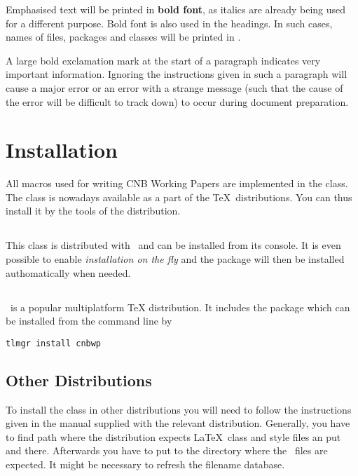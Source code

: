 \documentclass[12pt]{article}
\begin{document}
Emphasised text will be printed in \textbf{bold font}, as italics are already being used for a
different purpose. Bold font is also used in the headings. In such cases, names of files, packages
and classes will be printed in \textbf{}.

\pozor A large bold exclamation mark at the start of a paragraph indicates very important
information. Ignoring the instructions given in such a paragraph will cause a major error or an
error with a strange message (such that the cause of the error will be difficult to track down) to
occur during document preparation.

\section{Installation}\label{instalace} All macros used for writing CNB Working
Papers are implemented in the  class. The class is nowadays available as a part of
the \TeX\ distributions. You can thus install it by the tools of the distribution.

\subsection{\MikTeX}\label{inst.miktex}
This class is distributed with \MikTeX\ and can be installed from its console. It is even possible to
enable \textit{installation on the fly} and the package will then be installed authomatically when
needed.

\subsection{\TeXLive}\label{inst.tl}
\TeXLive\ is a popular multiplatform \TeX{} distribution. It includes the package which can be
installed from the command line by

\begin{verbatim}
tlmgr install cnbwp
\end{verbatim}
	
\subsection{Other Distributions}\label{inst.other}
To install the  class in other
distributions you will need to follow the instructions given in the manual supplied with the
relevant distribution. Generally, you have to find path where the distribution expects \LaTeX\
class and style files an put  and  there. Afterwards you have to
put \fn{abbrvcnb.bst} to the directory where the \BibTeX\ files are expected. It might be necessary
to refresh the filename database.
\end{document}

